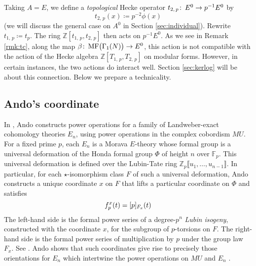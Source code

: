 \documentclass{gtpart}
\theoremstyle{definition}
\theoremstyle{remark}
\def\co{\colon\thinspace}
\newcommand{\mb}[1]{\mathbb{#1}}
\newcommand{\BF}{{\mb F}}
\newcommand{\BZ}{{\mb Z}}
\newcommand{\MF}{{\rm MF}}
\newcommand{\B}{\beta}
\newcommand{\G}{\Gamma}
\newcommand{\ce}{\coloneqq}
\newcommand{\lb}{\llbracket}
\newcommand{\rb}{\rrbracket}
\renewcommand{\=}{\approx}
\renewcommand{\-}{\sim}
\numberwithin{equation}{section}
\begin{document}
Taking $A = E$, we define a {\em topological} Hecke operator 
$t_{2,\,p} \co E^0 \to p^{-1} E^0$ by 
\begin{equation}
 \label{t2p}
 t_{2,\,p}(x) \ce p^{-2} \phi(x) 
\end{equation}
(we will discuss the general case on $A^0$ in Section \ref{sec:individual}).  
Rewrite $t_{1,\,p} \ce t_p$.  The ring $\BZ[t_{1,\,p},t_{2,\,p}]$ then acts on 
$p^{-1} E^0$.  As we see in Remark \ref{rmk:tc}, along the map 
$\B \co \MF\big(\G_1(N)\big) \to E^0$, this action is not compatible with the 
action of the Hecke algebra $\BZ[T_{1,\,p},T_{2,\,p}]$ on modular forms.  
However, in certain instances, the two actions do interact well.  Section 
\ref{sec:kerlog} will be about this connection.  Below we prepare a 
technicality.  



\subsection{Ando's coordinate}
\label{subsec:Ando}

In \cite{Ando95}, Ando constructs power operations for a family of 
Landweber-exact cohomology theories $E_n$, using power operations in the complex 
cobordism $MU$.  For a fixed prime $p$, each $E_n$ is a Morava $E$-theory whose 
formal group is a universal deformation of the Honda formal group $\Phi$ of 
height $n$ over $\BF_p$.  This universal deformation is defined over the 
Lubin-Tate ring $\BZ_p \lb u_1, \ldots, u_{n - 1} \rb$.  In particular, for each 
$\star$-isomorphism class $F$ of such a universal deformation, Ando constructs a 
unique coordinate $x$ on $F$ that lifts a particular coordinate on $\Phi$ and 
satisfies 
\begin{equation}
 \label{Ando}
 f_p^{\hskip 0.015cm x}(t) = [p]_{F_x}(t) 
\end{equation}
The left-hand side is the formal power series of a degree-$p^n$ 
{\em Lubin isogeny}, constructed with the coordinate $x$, for the subgroup of 
$p$-torsions on $F$.  The right-hand side is the formal power series of 
multiplication by $p$ under the group law $F_x$.  See 
\cite[Theorems 2.5.7 and 2.6.4]{Ando95}.  Ando shows that such coordinates give 
rise to precisely those orientations for $E_n$ which intertwine the power 
operations on $MU$ and $E_n$ \cite[Theorem 4.1.1]{Ando95}.  
\end{document}
